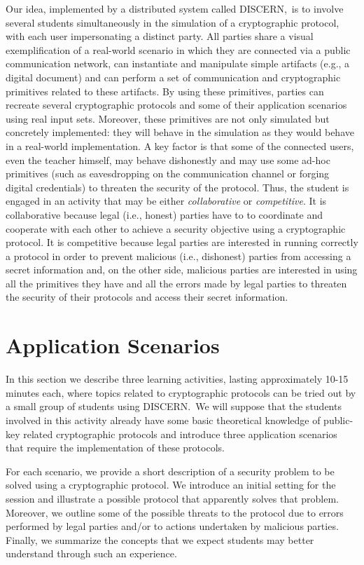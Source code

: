 \documentclass[conference]{IEEEtran}
\def\disgrace{DISCERN}
\begin{document}
Our idea, implemented by a distributed system called \disgrace,\ is to
involve several students simultaneously in the simulation of a
cryptographic protocol, with each user impersonating a distinct party.
All parties share a visual exemplification of a real-world scenario in
which they are connected via a public communication network, can
instantiate and manipulate simple artifacts (e.g., a digital document)
and can perform a set of communication and cryptographic primitives
related to these artifacts. By using these primitives, parties can
recreate several cryptographic protocols and some of their application
scenarios using real input sets. Moreover, these primitives are not
only simulated but concretely implemented: they will behave in the
simulation as they would behave in a real-world implementation.
A key factor is that some of the connected users, even the teacher himself, may behave dishonestly and
may use some ad-hoc primitives (such as eavesdropping on the
communication channel or forging digital credentials) to threaten the
security of the protocol. Thus, the student is engaged in an activity
that may be either {\em collaborative} or {\em competitive}. It is
collaborative because legal (i.e., honest) parties have to to
coordinate and cooperate with each other to achieve a security objective using a cryptographic
protocol. It is competitive because legal parties are interested in
running correctly a protocol in order to prevent malicious (i.e.,
dishonest) parties from accessing a secret information and, on the
other side, malicious parties are interested in using all the
primitives they have and all the errors made by legal parties
to threaten the security of their protocols and access their secret information.

\section{Application Scenarios}
\label{sec:application}
In this section we describe three learning activities, lasting
approximately 10-15 minutes each, where topics related to
cryptographic protocols can be tried out by a small group of students
using \disgrace.\ We will suppose that the
students involved in this activity already have some basic theoretical
knowledge of public-key related cryptographic protocols and introduce
three application scenarios that require the implementation of these
protocols.

For each scenario, we provide a short description of a security
problem to be solved using a cryptographic protocol. We introduce an
initial setting for the session and illustrate a possible protocol
that apparently solves that problem. Moreover, we outline some of the
possible threats to the protocol due to errors performed by legal
parties and/or to actions undertaken by malicious parties. Finally, we
summarize the concepts that we expect students may better understand
through such an experience.
\end{document}

